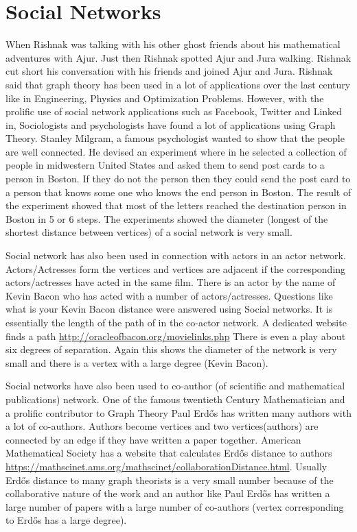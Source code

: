 \chapter{Social Networks}

When Rishnak was talking with his other ghost friends about his mathematical adventures with Ajur. Just then Rishnak spotted Ajur and Jura walking. Rishnak cut short his conversation with his friends and joined Ajur and Jura. Rishnak said that graph theory has been used in a lot of applications over the last century like in Engineering, Physics and Optimization Problems. However, with the prolific use of social network applications such as Facebook, Twitter and Linked in, Sociologists and psychologists have found a lot of applications using Graph Theory.  
Stanley Milgram, a famous psychologist wanted to show that the people are well connected. He devised an experiment where in he selected a collection of people in midwestern United States and asked them to send post cards to a person in Boston. If they do not the person then they could send the post card to a person that knows some one who knows the end person in Boston. The result of the experiment showed that most of the letters reached the destination person in Boston in 5 or 6 steps. The experiments showed the diameter (longest of the shortest distance between vertices) of a social network is very small.

Social network has also been used in connection with actors in an actor network. Actors/Actresses form the vertices and vertices are adjacent if the corresponding actors/actresses have acted in the same film. There is an actor by the name of Kevin Bacon who has acted with a number of actors/actresses. Questions like what is your Kevin Bacon distance were answered using Social networks. It is essentially the length of the path of in the co-actor network. A dedicated website finds a path \url{http://oracleofbacon.org/movielinks.php} There is even a play about six degrees of separation. Again this shows the diameter of the network is very small and there is a vertex with a large degree (Kevin Bacon).

Social networks have also been used to co-author (of scientific and mathematical publications) network. One of the famous twentieth Century Mathematician and a prolific contributor to Graph Theory Paul Erd\H{o}s has written many authors with a lot of co-authors. Authors become vertices and two vertices(authors) are connected by an edge if they have written a paper together. American Mathematical Society has a website that calculates Erd\H{o}s distance to authors
\url{https://mathscinet.ams.org/mathscinet/collaborationDistance.html}. Usually Erd\H{o}s distance to many graph theorists is a very small number because of the collaborative nature of the work and an author like Paul Erd\H{o}s has written a large number of papers with a large number of co-authors (vertex corresponding to Erd\H{o}s has a large degree).

